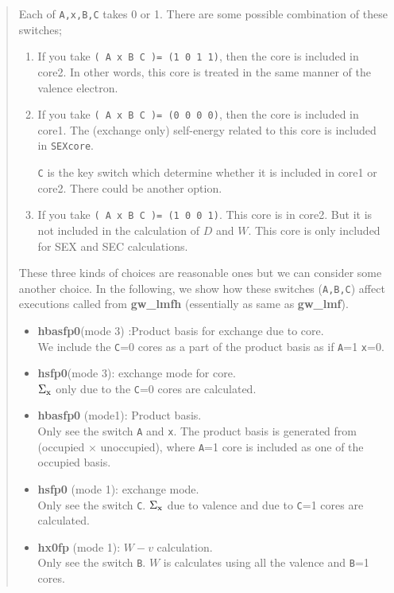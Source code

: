 \documentclass[a4paper,10pt,epsf,fleqn]{article}
\newcommand{\exe}[1]{{\bf #1}}
\newcommand{\raw}[1]{{\tt #1}}
\begin{document}
{\begin{quote}
Each of \raw{A,x,B,C} takes 0 or 1.
There are some possible combination of these switches;
\begin{enumerate}
\item 
If you take 
{\tt ( A  x   B    C )= (1 0 1 1)},
then the core is included in core2. In other words, this core is treated in the same 
manner of the valence electron.

\item 
If you take
{\tt ( A  x   B    C )= (0 0 0 0)},
then the core is included in core1.
The (exchange only) self-energy related to this core is included in {\tt SEXcore}.

\raw{C} is the key switch which determine whether it is included in core1 or core2.
There could be another option.

\item 
If you take
{\tt ( A  x   B    C )= (1 0 0 1)}.
This core is in core2. But it is not included in the calculation of $D$ and $W$.
This core is only included for SEX and SEC calculations.
\end{enumerate}
These three kinds of choices are reasonable ones but we can consider some another choice.
In the following, we show how these switches (\verb#A,B,C#) affect executions called from 
\exe{gw\_lmfh} (essentially as same as \exe{gw\_lmf}).
\begin{itemize}
\item 
\exe{hbasfp0}(mode 3) :Product basis for exchange due to core.\\
We include the \raw{C}=0 cores as a part of
the product basis as if \raw{A}=1 \raw{x}=0.

\item 
\exe{hsfp0}(mode 3): exchange mode for core.\\
$\Sigma_{\rm x}$ only due to the \raw{C}=0 cores are calculated.

\item 
\exe{hbasfp0} (mode1): Product basis.\\
Only see the switch \raw{A} and \raw{x}.
The product basis is generated from (occupied $\times$ unoccupied), 
where \raw{A}=1 core is included as one of the occupied basis.

\item 
\exe{hsfp0} (mode 1): exchange mode.\\
Only see the switch \raw{C}.
$\Sigma_{\rm x}$ due to valence and due to \raw{C}=1 cores
are calculated.

\item 
\exe{hx0fp} (mode 1): $W-v$ calculation.\\
Only see the switch \raw{B}.
$W$ is calculates using all the valence and \raw{B}=1 cores.


\end{itemize}
\end{quote}}
\end{document}
